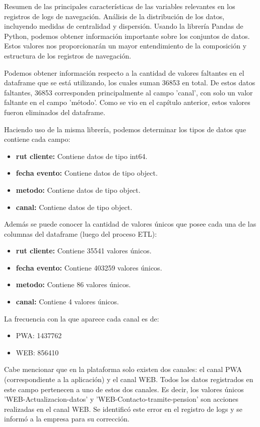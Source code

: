 Resumen de las principales características de las variables relevantes en los registros de logs de navegación. Análisis de la distribución de los datos, incluyendo medidas de centralidad y dispersión. Usando la librería Pandas de Python, podemos obtener información importante sobre los conjuntos de datos. Estos valores nos proporcionarán un mayor entendimiento de la composición y estructura de los registros de navegación.

Podemos obtener información respecto a la cantidad de valores faltantes en el dataframe que se está utilizando, los cuales suman 36853 en total. De estos datos faltantes, 36853 corresponden principalmente al campo 'canal', con solo un valor faltante en el campo 'método'. Como se vio en el capítulo anterior, estos valores fueron eliminados del dataframe.

Haciendo uso de la misma librería, podemos determinar los tipos de datos que contiene cada campo:

\begin{itemize}
    \item \textbf{rut cliente:} Contiene datos de tipo int64.
    \item \textbf{fecha evento:} Contiene datos de tipo object.
    \item \textbf{metodo:} Contiene datos de tipo object.
    \item \textbf{canal:} Contiene datos de tipo object.
\end{itemize}

Además se puede conocer la cantidad de valores únicos que posee cada una de las columnas del dataframe (luego del proceso ETL):

\begin{itemize}
    \item \textbf{rut cliente:} Contiene 35541 valores únicos.
    \item \textbf{fecha evento:} Contiene 403259 valores únicos.
    \item \textbf{metodo:} Contiene 86 valores únicos.
    \item \textbf{canal:} Contiene 4 valores únicos.
\end{itemize}

La frecuencia con la que aparece cada canal es de:
\begin{itemize}
    \item PWA: 1437762
    \item WEB: 856410
\end{itemize}

Cabe mencionar que en la plataforma solo existen dos canales: el canal PWA (correspondiente a la aplicación) y el canal WEB. Todos los datos registrados en este campo pertenecen a uno de estos dos canales. Es decir, los valores únicos 'WEB-Actualizacion-datos' y 'WEB-Contacto-tramite-pension' son acciones realizadas en el canal WEB. Se identificó este error en el registro de logs y se informó a la empresa para su corrección.

